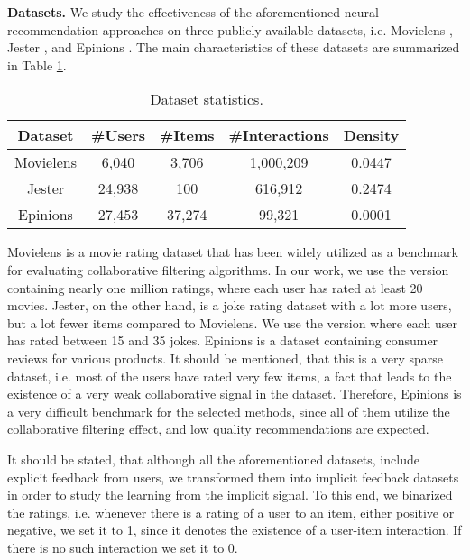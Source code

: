 
\textbf{Datasets.}
We study the effectiveness of the aforementioned neural recommendation approaches on three publicly available datasets, i.e. Movielens \cite{harper2016movielens}, Jester \cite{jester}, and Epinions \cite{epinions}. 
The main characteristics of these datasets are summarized in Table \ref{tab:datasets}.

\begin{table}[h]
    \centering
    \begin{tabular}{c|c|c|c|c}
        \hline
        Dataset & \#Users & \#Items & \#Interactions & Density \\
        \hline
        Movielens &  6,040 &  3,706 & 1,000,209 & 0.0447 \\
        Jester    & 24,938 &    100 &   616,912 & 0.2474 \\
        Epinions  & 27,453 & 37,274 &    99,321 & 0.0001
    \end{tabular}
    \caption{Dataset statistics.}
    \label{tab:datasets}
\end{table}

Movielens is a movie rating dataset that has been widely utilized as a benchmark for evaluating collaborative filtering algorithms.
In our work, we use the version containing nearly one million ratings, where each user has rated at least 20 movies.
Jester, on the other hand, is a joke rating dataset with a lot more users, but a lot fewer items compared to Movielens.
We use the version where each user has rated between 15 and 35 jokes.
Epinions is a dataset containing consumer reviews for various products. 
It should be mentioned, that this is a very sparse dataset, i.e. most of the users have rated very few items, a fact that leads to the existence of a very weak collaborative signal in the dataset. 
Therefore, Epinions is a very difficult benchmark for the selected methods, since all of them utilize the collaborative filtering effect, and low quality recommendations are expected.

It should be stated, that although all the aforementioned datasets, include explicit feedback from users, we transformed them into implicit feedback datasets in order to study the learning from the implicit signal.
To this end, we binarized the ratings, i.e. whenever there is a rating of a user to an item, either positive or negative, we set it to 1, since it denotes the existence of a user-item interaction. 
If there is no such interaction we set it to 0.


